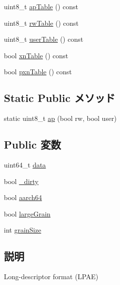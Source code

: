 \begin{DoxyCompactItemize}
\item 
uint8\_\-t \hyperlink{classArmISA_1_1TableWalker_1_1LongDescriptor_a5bfc4dbbd618e97ade22c3243205a334}{apTable} () const 
\item 
uint8\_\-t \hyperlink{classArmISA_1_1TableWalker_1_1LongDescriptor_a478caeac81ef334cf6698c8ba3f027fb}{rwTable} () const 
\item 
uint8\_\-t \hyperlink{classArmISA_1_1TableWalker_1_1LongDescriptor_a8d695176b203e8d330ab60017cfb8e24}{userTable} () const 
\item 
bool \hyperlink{classArmISA_1_1TableWalker_1_1LongDescriptor_a918336097d9455741b30786d6e46f73d}{xnTable} () const 
\item 
bool \hyperlink{classArmISA_1_1TableWalker_1_1LongDescriptor_a4cabfe03c27a0613a975eb34f5dc311a}{pxnTable} () const 
\end{DoxyCompactItemize}
\subsection*{Static Public メソッド}
\begin{DoxyCompactItemize}
\item 
static uint8\_\-t \hyperlink{classArmISA_1_1TableWalker_1_1LongDescriptor_a86d1f2fd0beb21ce5ffa7925768e378b}{ap} (bool rw, bool user)
\end{DoxyCompactItemize}
\subsection*{Public 変数}
\begin{DoxyCompactItemize}
\item 
uint64\_\-t \hyperlink{classArmISA_1_1TableWalker_1_1LongDescriptor_ae421a8889820e685feae3e58e1d5fca0}{data}
\item 
bool \hyperlink{classArmISA_1_1TableWalker_1_1LongDescriptor_ad9d7d92a6dc33a9bf186020af3053844}{\_\-dirty}
\item 
bool \hyperlink{classArmISA_1_1TableWalker_1_1LongDescriptor_a52c06c8a54293998f3e1f71cdbd916f7}{aarch64}
\item 
bool \hyperlink{classArmISA_1_1TableWalker_1_1LongDescriptor_a0147ae2ff00e021ff30ba60e73de3e09}{largeGrain}
\item 
int \hyperlink{classArmISA_1_1TableWalker_1_1LongDescriptor_a887606cb7c0d8e19afb1a67ac7293519}{grainSize}
\end{DoxyCompactItemize}


\subsection{説明}
Long-\/descriptor format (LPAE) 

